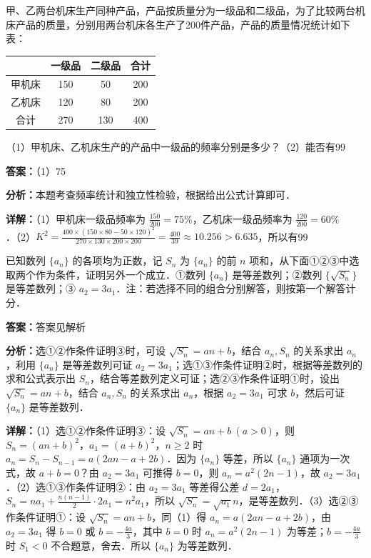 \begin{question}[points=12]
甲、乙两台机床生产同种产品，产品按质量分为一级品和二级品，为了比较两台机床产品的质量，分别用两台机床各生产了200件产品，产品的质量情况统计如下表：\begin{tabular}{|c|c|c|c|} \hline & 一级品 & 二级品 & 合计 \\ \hline 甲机床 & 150 & 50 & 200 \\ \hline 乙机床 & 120 & 80 & 200 \\ \hline 合计 & 270 & 130 & 400 \\ \hline \end{tabular}（1）甲机床、乙机床生产的产品中一级品的频率分别是多少？（2）能否有99%
\begin{solution}
\textbf{答案：}（1）75%

\textbf{分析：}本题考查频率统计和独立性检验，根据给出公式计算即可．

\textbf{详解：}（1）甲机床一级品频率为 $\frac{150}{200}=75\%$，乙机床一级品频率为 $\frac{120}{200}=60\%$．（2）$K^2 = \frac{400\times(150\times80-50\times120)^2}{270\times130\times200\times200} = \frac{400}{39} \approx 10.256 > 6.635$，所以有99%
\end{solution}
\end{question}

\begin{question}[points=12]
已知数列 $\{a_n\}$ 的各项均为正数，记 $S_n$ 为 $\{a_n\}$ 的前 $n$ 项和，从下面①②③中选取两个作为条件，证明另外一个成立．①数列 $\{a_n\}$ 是等差数列；②数列 $\{\sqrt{S_n}\}$ 是等差数列；③ $a_2 = 3a_1$．注：若选择不同的组合分别解答，则按第一个解答计分．
\begin{solution}
\textbf{答案：}答案见解析

\textbf{分析：}选①②作条件证明③时，可设 $\sqrt{S_n} = an+b$，结合 $a_n, S_n$ 的关系求出 $a_n$，利用 $\{a_n\}$ 是等差数列可证 $a_2=3a_1$；选①③作条件证明②时，根据等差数列的求和公式表示出 $S_n$，结合等差数列定义可证；选②③作条件证明①时，设出 $\sqrt{S_n}=an+b$，结合 $a_n, S_n$ 的关系求出 $a_n$，根据 $a_2=3a_1$ 可求 $b$，然后可证 $\{a_n\}$ 是等差数列．

\textbf{详解：}（1）选①②作条件证明③：设 $\sqrt{S_n}=an+b \ (a>0)$，则 $S_n = (an+b)^2$，$a_1 = (a+b)^2$，$n\ge2$ 时 $a_n = S_n - S_{n-1} = a(2an-a+2b)$．因为 $\{a_n\}$ 等差，所以 $\{a_n\}$ 通项为一次式，故 $a+b=0$？由 $a_2=3a_1$ 可推得 $b=0$，则 $a_n = a^2(2n-1)$，故 $a_2=3a_1$．（2）选①③作条件证明②：由 $a_2=3a_1$ 等差得公差 $d=2a_1$，$S_n = na_1 + \frac{n(n-1)}{2}\cdot 2a_1 = n^2 a_1$，所以 $\sqrt{S_n} = \sqrt{a_1} n$，是等差数列．（3）选②③作条件证明①：设 $\sqrt{S_n}=an+b$，同（1）得 $a_n = a(2an - a + 2b)$，由 $a_2=3a_1$ 得 $b=0$ 或 $b=-\frac{4a}{3}$，其中 $b=0$ 时 $a_n = a^2(2n-1)$ 为等差；$b=-\frac{4a}{3}$ 时 $S_1<0$ 不合题意，舍去．所以 $\{a_n\}$ 为等差数列．
\end{solution}
\end{question}

